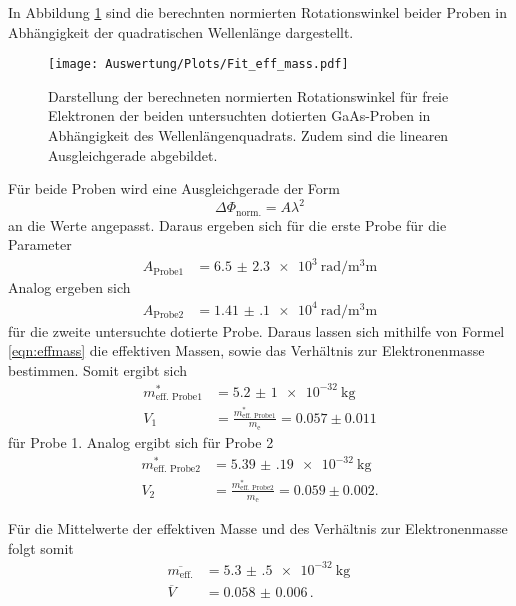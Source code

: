 In Abbildung \ref{fig:beideProben} sind die berechnten normierten Rotationswinkel beider Proben in
Abhängigkeit der quadratischen Wellenlänge dargestellt.
\begin{figure}[H]
  \centering
  \texttt{[image: Auswertung/Plots/Fit\_eff\_mass.pdf]}
  \caption{Darstellung der berechneten normierten Rotationswinkel für freie Elektronen der beiden untersuchten
  dotierten GaAs-Proben in Abhängigkeit des Wellenlängenquadrats. Zudem sind die linearen
  Ausgleichgerade abgebildet.}
  \label{fig:beideProben}
\end{figure} \noindent
Für beide Proben wird eine Ausgleichgerade der
Form
\begin{equation*}
  \Delta \Phi_\text{norm.} = A \lambda^2
\end{equation*} \noindent
an die Werte angepasst. Daraus ergeben sich für die erste Probe für die Parameter
\begin{align*}
  A_\text{Probe1} &= \SI{6.5(23)e3}{\radian\per\cubic\milli\meter}
\end{align*} \noindent
Analog ergeben sich
\begin{align*}
  A_\text{Probe2} &= \SI{1.41(10)e4}{\radian\per\cubic\milli\meter}
\end{align*} \noindent
für die zweite untersuchte dotierte Probe. Daraus lassen sich mithilfe von Formel \ref{eqn:effmass}
die effektiven Massen, sowie das Verhältnis zur Elektronenmasse bestimmen. Somit ergibt sich
\begin{align*}
  m_\text{eff. Probe1}^* &= \SI{5.2(10)e-32}{\kilo\gram} \\
  V_1 &= \frac{m_\text{eff. Probe1}^*}{m_\text{e}} = 0.057 \pm 0.011
\end{align*}
für Probe 1. Analog ergibt sich für Probe 2
\begin{align*}
  m_\text{eff. Probe2}^* &= \SI{5.39(19)e-32}{\kilo\gram} \\
  V_2 &= \frac{m_\text{eff. Probe2}^*}{m_\text{e}} = 0.059 \pm 0.002.
\end{align*} \noindent

Für die Mittelwerte der effektiven Masse und des Verhältnis zur Elektronenmasse folgt somit
\begin{align}
  \overline{m_\text{eff.}} &= \SI{5.3(5)e-32}{\kilo\gram} \nonumber \, \\
  \overline{V} &= \num{0.058(6)} \, .
  \label{eqn:V_eff}
\end{align}
